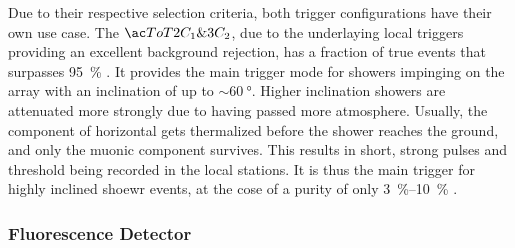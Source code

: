 Due to their respective selection criteria, both trigger configurations have 
their own use case. The $\ToT2C_1\&3C_2$, due to the underlaying local triggers
providing an excellent background rejection, has a fraction of true \EAS events
that surpasses \SI{95}{\percent} . It provides the
main trigger mode for showers impinging on the array with an inclination of up 
to $\sim\SI{60}{\degree}$. Higher inclination showers are attenuated more 
strongly due to having passed more atmosphere. Usually, the \EM component of 
horizontal \EASs gets thermalized before the shower reaches the ground, and 
only the muonic component survives. This results in short, strong pulses and 
threshold \TTWOs being recorded in the local stations.  It is thus the main 
trigger for highly inclined shoewr events, at the cose of a purity of only 
\SIrange{3}{10}{\percent}  \cite{todo, abrahamTriggerApertureSurface2010}.

\subsubsection{Fluorescence Detector}


